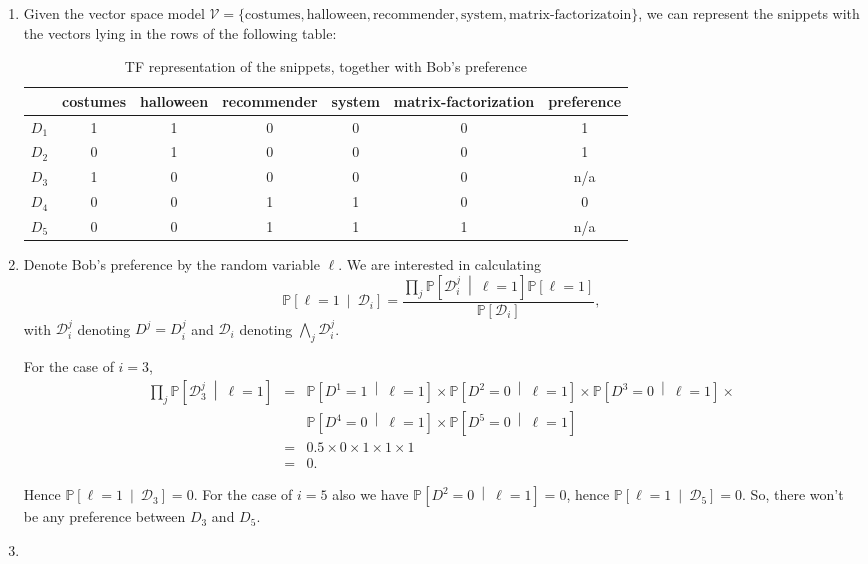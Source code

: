 \documentclass[DIN, pagenumber=false, fontsize=11pt, parskip=half]{scrartcl}
\newcommand{\prob}[1]{\mathbb{P}\left[ #1 \right]}
\newcommand{\probm}[2]{\mathbb{P}\left[ #1 ~\middle|~ #2 \right]}
\newcommand{\D}{\mathcal{D}}
\begin{document}
\begin{enumerate}[label=\alph*)]

\item %
Given the vector space model $\mathcal{V} = \{\mathrm{costumes}, \mathrm{halloween}, \mathrm{recommender}, \mathrm{system}, \mbox{matrix-factorizatoin}\}$, we can represent the snippets with the vectors lying in the rows of the following table:

\begin{table}[htb]
\centering
\label{tab:bob-and-5}
\begin{tabular}{|l|ccccc|c|}
\hline
   & costumes & halloween & recommender & system & matrix-factorization & preference \\
   \hline \hline
   $D_1$ & 1 & 1 & 0 & 0 & 0 & 1 \\
   $D_2$ & 0 & 1 & 0 & 0 & 0 & 1 \\
   $D_3$ & 1 & 0 & 0 & 0 & 0 & n/a \\
   $D_4$ & 0 & 0 & 1 & 1 & 0 & 0 \\
   $D_5$ & 0 & 0 & 1 & 1 & 1 & n/a \\
   \hline
\end{tabular}
\caption{TF representation of the snippets, together with Bob's preference}
\end{table}

\item %
Denote Bob's preference by the random variable $\ell$. We are interested in calculating
\[
\probm{\ell = 1}{\D_i} = \frac{\prod_j \probm{\D_i^j}{\ell = 1}\prob{\ell = 1}}{\prob{\D_i}},
\]
with $\D_i^j$ denoting $D^j = D_i^j$ and $\D_i$ denoting $\bigwedge_j \D_i^j$.

For the case of $i=3$,
\begin{eqnarray*}
\prod_j \probm{\D_3^j}{\ell = 1} &=& \probm{D^1 = 1}{\ell = 1} \times \probm{D^2 = 0}{\ell = 1} \times \probm{D^3 = 0}{\ell = 1} \times \\
&& \probm{D^4 = 0}{\ell = 1} \times \probm{D^5 = 0}{\ell = 1} \\
&=& 0.5 \times 0 \times 1 \times 1 \times 1 \\
&=& 0.
\end{eqnarray*}

Hence $\probm{\ell = 1}{\D_3} = 0$. For the case of $i = 5$ also we have $\probm{D^2 = 0}{\ell=1} = 0$, hence $\probm{\ell = 1}{\D_5} = 0$. So, there won't be any preference between $D_3$ and $D_5$.

\item %


\end{enumerate}
\end{document}
